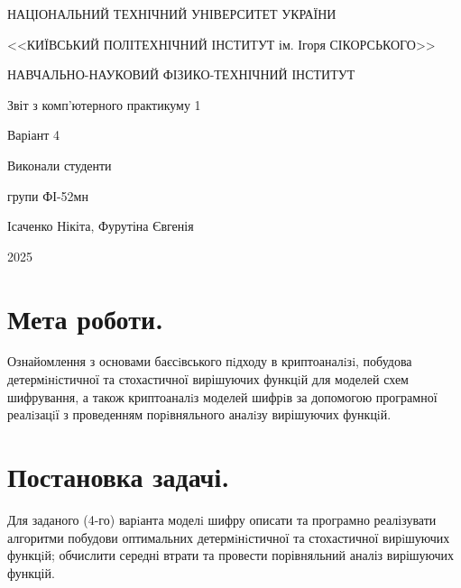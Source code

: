 \documentclass[a4paper,12pt]{article}
\begin{document}
\begin{titlepage}

\begin{center}
{\large НАЦІОНАЛЬНИЙ ТЕХНІЧНИЙ УНІВЕРСИТЕТ УКРАЇНИ} \par
{\large <<КИЇВСЬКИЙ ПОЛІТЕХНІЧНИЙ ІНСТИТУТ ім. Ігоря СІКОРСЬКОГО>>}\par
{\large НАВЧАЛЬНО-НАУКОВИЙ ФІЗИКО-ТЕХНІЧНИЙ ІНСТИТУТ}\par

\vspace{60mm}
{\huge Звіт з комп'ютерного практикуму 1 \par}
\vspace{5mm}
{\Large Варіант 4 \par}
\end{center}

\vspace{60mm}
\begin{flushright}
{\Large Виконали студенти}

{\Large групи ФІ-52мн}

{\Large Ісаченко Нікіта, Фурутіна Євгенія}

\vspace{30mm}
\end{flushright}
\vspace{20mm}

\begin{center}
{\Large 2025}
\end{center}



\end{titlepage}

\section{Мета роботи.}
Ознайомлення з основами баєсiвського пiдходу в криптоаналiзi, побудова детермiнiстичної та стохастичної вирішуючих функцiй для моделей схем шифрування, а також криптоаналiз моделей шифрiв за допомогою програмної реалiзацiї з проведенням порiвняльного аналiзу вирішуючих функцiй.


\section{Постановка задачі.}
Для заданого (4-го) варiанта моделi шифру описати та програмно реалізувати алгоритми побудови оптимальних детермiнiстичної та стохастичної вирiшуючих функцiй; обчислити середні втрати та провести порівняльний аналіз вирішуючих функцій.
\end{document}
